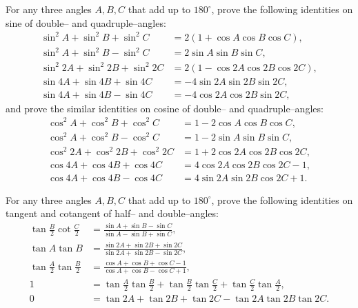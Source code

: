 \documentclass[12pt,a4paper]{memoir}
\theoremstyle{definition}
\begin{document}
\begin{question}
	For any three angles $A,B,C$ that add up to $180^\circ$, prove the following identities on sine of double-- and quadruple--angles:
	\begin{align*}
		\sin^2 A + \sin^2 B + \sin^2 C &= 2 (1+\cos A \cos B \cos C),\\
		\sin^2 A + \sin^2 B - \sin^2 C &= 2 \sin A \sin B \sin C,\\
		\sin^2 2A + \sin^2 2B + \sin^2 2C &= 2 (1-\cos 2A \cos 2B \cos 2C),\\
		\sin 4A + \sin 4B + \sin 4C &= -4\sin 2A \sin 2B \sin 2C,\\
		\sin 4A + \sin 4B - \sin 4C &= -4\cos 2A \cos 2B \sin 2C,
	\end{align*}
	and prove the similar identities on cosine of double-- and quadruple--angles:
	\begin{align*}
		\cos^2 A + \cos^2 B + \cos^2 C &= 1-2\cos A \cos B \cos C,\\
		\cos^2 A + \cos^2 B - \cos^2 C &= 1-2\sin A \sin B \sin C,\\
		\cos^2 2A + \cos^2 2B + \cos^2 2C &= 1+2\cos 2A \cos 2B \cos 2C,\\
		\cos 4A + \cos 4B + \cos 4C &= 4\cos 2A \cos 2B \cos 2C - 1,\\
		\cos 4A + \cos 4B - \cos 4C &= 4\sin 2A \sin 2B \cos 2C + 1.
	\end{align*}
\end{question}

\begin{question}
	For any three angles $A,B,C$ that add up to $180^\circ$, prove the following identities on tangent and cotangent of half-- and double--angles:
	\begin{align*}
		\tan \frac{B}{2} \cot \frac{C}{2} &= \frac{\sin A + \sin B - \sin C}{\sin A - \sin B + \sin C},\\
		\tan A \tan B &= \frac{\sin 2A + \sin 2B + \sin 2C}{\sin 2A + \sin 2B - \sin 2C},\\
		\tan\frac{A}{2}\tan\frac{B}{2} &= \frac{\cos A + \cos B + \cos C - 1}{\cos A + \cos B - \cos C + 1},\\
		1 &= \tan\frac{A}{2}\tan\frac{B}{2}+\tan\frac{B}{2}\tan\frac{C}{2}+\tan\frac{C}{2}\tan\frac{A}{2},\\
		0 &= \tan 2A + \tan 2B + \tan 2C - \tan 2A \tan 2B \tan 2C.
	\end{align*}
\end{question}
\end{document}
